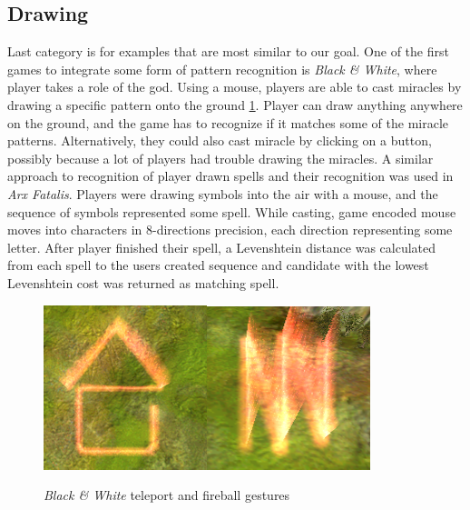 \subsection{Drawing}
Last category is for examples that are most similar to our goal. One of the first games to integrate some form of pattern recognition is \emph{Black \& White}, where player takes a role of the god. Using a mouse, players are able to cast miracles by drawing a specific pattern onto the ground \ref{fig:blackwhite}. Player can draw anything anywhere on the ground, and the game has to recognize if it matches some of the miracle patterns. Alternatively, they could also cast miracle by clicking on a button, possibly because a lot of players had trouble drawing the miracles. A similar approach to recognition of player drawn spells and their recognition was used in \emph{Arx Fatalis}. Players were drawing symbols into the air with a mouse, and the sequence of symbols represented some spell. While casting, game encoded mouse moves into characters in 8-directions precision, each direction representing some letter. After player finished their spell, a Levenshtein distance was calculated from each spell to the users created sequence and candidate with the lowest Levenshtein cost was returned as matching spell.

\begin{figure}[!htb]
\begin{center}
\label{fig:blackwhite}
\includegraphics[width=.3\linewidth]{ext/gestureteleport.png}\quad\includegraphics[width=.3\linewidth]{ext/gesturefireball.png}
\end{center}
	\centering
	\caption{\emph{Black \& White} teleport and fireball gestures}
\end{figure}

